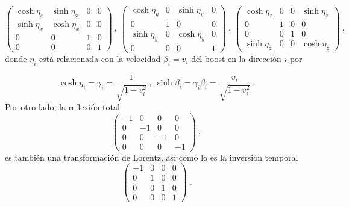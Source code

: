 \begin{equation}
\left( 
\begin{array}{cccc}
\cosh \eta _{x} & \sinh \eta _{x} & 0 & 0 \\ 
\sinh \eta _{x} & \cosh \eta _{x} & 0 & 0 \\ 
0 & 0 & 1 & 0 \\ 
0 & 0 & 0 & 1
\end{array}
\right) ~,~\left( \begin{array}{cccc}
\cosh \eta _{y} & 0 & \sinh \eta _{y} & 0 \\ 
0 & 1 & 0 & 0 \\ 
\sinh \eta _{y} & 0 & \cosh \eta _{y} & 0 \\ 
0 & 0 & 0 & 1%
\end{array}
\right) ~,~\left( \begin{array}{cccc}
\cosh \eta _{z} & 0 & 0 & \sinh \eta _{z} \\ 
0 & 1 & 0 & 0 \\ 
0 & 0 & 1 & 0 \\ 
\sinh \eta _{z} & 0 & 0 & \cosh \eta _{z}
\end{array} \right) ~,
\label{boots}
\end{equation}
donde $\eta_{i}$ está relacionada con la velocidad $\beta_{i}=v_{i}$ del boost en la dirección $i$ por

\begin{equation*}
    \cosh \eta _{i}= \gamma_{i}=\frac{1}{\sqrt{1-v_{i}^{2}}}~,~\sinh \beta _{i}= \gamma_{i}\beta_{i} =\frac{v_{i}}{\sqrt{1-v_{i}^{2}}}~.
\end{equation*}
Por otro lado, la reflexión total
\begin{equation}
\left( \begin{array}{cccc}
-1 & 0 & 0 & 0 \\ 
0 & -1 & 0 & 0 \\ 
0 & 0 & -1 & 0 \\ 
0 & 0 & 0 & -1
\end{array}\right)
~,
\end{equation}
 es también una transformación de Lorentz, así como lo es la inversión temporal
\begin{equation}
\left(\begin{array}{cccc}
-1 & 0 & 0 & 0 \\ 
0 & 1 & 0 & 0 \\ 
0 & 0 & 1 & 0 \\ 
0 & 0 & 0 & 1
\end{array}\right)~.
\end{equation}

